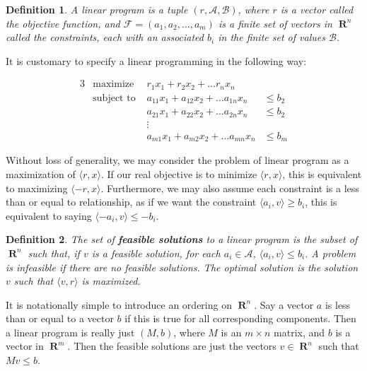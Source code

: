 \documentclass{report}
\DeclareMathOperator{\real}{\mathbf{R}}
\newtheorem{definition}{Definition}
\begin{document}
    \begin{definition}
        A linear program is a tuple $(r,\mathcal{A}, \mathcal{B})$, where $r$ is a vector called the objective function, and $\mathcal{F} = (a_1, a_2, \dots, a_m)$ is a finite set of vectors in $\real^n$ called the constraints, each with an associated $b_i$ in the finite set of values $\mathcal{B}$.
    \end{definition}

    It is customary to specify a linear programming in the following way:

    \begin{alignat*}{3}
        &\text{maximize }   & r_1x_1 + r_2x_2 + \dots r_nx_n &\\
        &\text{subject to } & a_{11}x_1 + a_{12}x_2 + \dots a_{1n}x_n &\leq b_2\\
        &                   & a_{21}x_1 + a_{22}x_2 + \dots a_{2n}x_n &\leq b_2\\
        &                   & \vdots &\\
        &                   & a_{m1}x_1 + a_{m2}x_2 + \dots a_{mn}x_n &\leq b_m
    \end{alignat*}

    Without loss of generality, we may consider the problem of linear program as a maximization of $\langle r, x \rangle$. If our real objective is to minimize $\langle r, x \rangle$, this is equivalent to maximizing $\langle -r, x \rangle$. Furthermore, we may also assume each constraint is a less than or equal to relationship, as if we want the constraint $\langle a_i, v \rangle \geq b_i$, this is equivalent to saying $\langle -a_i, v \rangle \leq -b_i$.

    \begin{definition}
        The set of {\bf feasible solutions} to a linear program is the subset of $\real^n$ such that, if $v$ is a feasible solution, for each $a_i \in \mathcal{A}$, $\langle a_i, v \rangle \leq b_i$. A problem is infeasible if there are no feasible solutions. The optimal solution is the solution $v$ such that $\langle v, r \rangle$ is maximized.
    \end{definition}

    It is notationally simple to introduce an ordering on $\real^n$. Say a vector $a$ is less than or equal to a vector $b$ if this is true for all corresponding components. Then a linear program is really just $(M,b)$, where $M$ is an $m \times n$ matrix, and $b$ is a vector in $\real^m$. Then the feasible solutions are just the vectors $v \in \real^n$ such that $Mv \leq b$.
\end{document}
